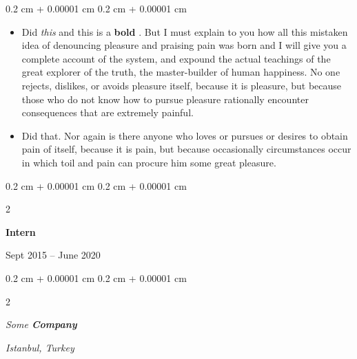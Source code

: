 \documentclass[10pt, letterpaper]{article}
\newenvironment{highlights}{
    \begin{itemize}[
        topsep=0.10 cm,
        parsep=0.10 cm,
        partopsep=0pt,
        itemsep=0pt,
        leftmargin=0.4 cm + 10pt
    ]
}{
    \end{itemize}
} %
\newenvironment{onecolentry}{
    \begin{adjustwidth}{
        0.2 cm + 0.00001 cm
    }{
        0.2 cm + 0.00001 cm
    }
}{
    \end{adjustwidth}
} %
\newenvironment{twocolentry}[2][]{
    \onecolentry
    \def\secondColumn{#2}
    \setcolumnwidth{\fill, 4.5 cm}
    \begin{paracol}{2}
}{
    \switchcolumn \raggedleft \secondColumn
    \end{paracol}
    \endonecolentry
} %
\let\hrefWithoutArrow\href
\renewcommand{\href}[2]{\hrefWithoutArrow{#1}{\ifthenelse{\equal{#2}{}}{ }{#2 }\raisebox{.15ex}{\footnotesize \faExternalLink*}}}
\begin{document}
        \vspace{0.10 cm}
        \begin{onecolentry}
            \begin{highlights}
                \item Did \textit{this} and this is a \textbf{bold} \href{https://example.com}{link}. But I must explain to you how all this mistaken idea of denouncing pleasure and praising pain was born and I will give you a complete account of the system, and expound the actual teachings of the great explorer of the truth, the master-builder of human happiness. No one rejects, dislikes, or avoids pleasure itself, because it is pleasure, but because those who do not know how to pursue pleasure rationally encounter consequences that are extremely painful.
                \item Did that. Nor again is there anyone who loves or pursues or desires to obtain pain of itself, because it is pain, but because occasionally circumstances occur in which toil and pain can procure him some great pleasure.
            \end{highlights}
        \end{onecolentry}


        \vspace{0.2 cm}

                \begin{twocolentry}{
                    Sept 2015 – June 2020
                }
                \textbf{Intern}
                \end{twocolentry}
            \begin{twocolentry}{
        \textit{Istanbul, Turkey}    }
            \textit{Some \textbf{Company}}
            \end{twocolentry}
\end{document}
